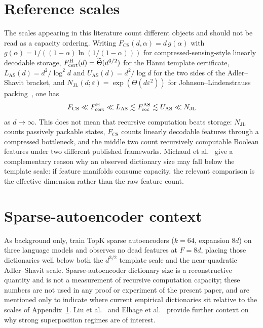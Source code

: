 \section{Reference scales}
\label{app:scales}

The scales appearing in this literature count different objects and should not be read as a
capacity ordering. Writing $F_{\mathrm{CS}}(d,\alpha)=d\,g(\alpha)$ with
$g(\alpha)=1/((1-\alpha)\ln(1/(1-\alpha)))$ for compressed-sensing-style linearly decodable
storage, $F^{\mathrm{H}}_{\mathrm{cert}}(d)=\widetilde{\Theta}(d^{3/2})$ for the H\"{a}nni template
certificate, $L_{\mathrm{AS}}(d)=d^2/\log^2 d$ and $U_{\mathrm{AS}}(d)=d^2/\log d$ for the two
sides of the Adler--Shavit bracket, and $N_{\mathrm{JL}}(d;\varepsilon)=\exp(\Theta(d
\varepsilon^2))$ for Johnson--Lindenstrauss packing~\cite{JL1984}, one has
\[
  F_{\mathrm{CS}}\ll F^{\mathrm{H}}_{\mathrm{cert}}\ll L_{\mathrm{AS}}
  \lesssim F_{\mathrm{rec}}^{\mathrm{AS}}\lesssim U_{\mathrm{AS}}\ll N_{\mathrm{JL}}
\]
as $d\to\infty$. This does not mean that recursive computation beats storage:
$N_{\mathrm{JL}}$ counts passively packable states, $F_{\mathrm{CS}}$ counts linearly decodable
features through a compressed bottleneck, and the middle two count recursively computable
Boolean features under two different published frameworks. Michaud et
al.~\cite{michaud2025manifolds} give a complementary reason why an observed dictionary size may
fall below the template scale: if feature manifolds consume capacity, the relevant comparison
is the effective dimension rather than the raw feature count.

\section{Sparse-autoencoder context}
\label{app:sae}

As background only, \citet{borobia2026pruning} train TopK sparse
autoencoders ($k=64$, expansion $8d$) on three language models and observes no dead features at
$F=8d$, placing those dictionaries well below both the $d^{3/2}$ template scale and the
near-quadratic Adler--Shavit scale. Sparse-autoencoder dictionary size is a reconstructive
quantity and is not a measurement of recursive computation capacity; these numbers are not used
in any proof or experiment of the present paper, and are mentioned only to indicate where
current empirical dictionaries sit relative to the scales of Appendix~\ref{app:scales}.
Liu et al.~\cite{liu2025scaling} and Elhage et al.~\cite{elhage2022superposition} provide
further context on why strong superposition regimes are of interest.
